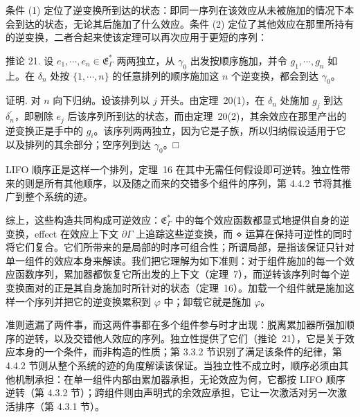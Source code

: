 条件 (1) 定位了逆变换所到达的状态：即同一序列在该效应从未被施加的情况下本会到达的状态，无论其后施加了什么效应。条件 (2) 定位了其他效应在那里所持有的逆变换，二者合起来使该定理可以再次应用于更短的序列：

推论 21. 设 \(e _ { 1 } , \cdots , e _ { n } \in \mathfrak { E } _ { \Gamma } ^ { * }\) 两两独立，从
\(\gamma _ { 0 }\) 出发按顺序施加，并令 \(g _ { 1 } , \cdots , g _ { n }\) 如上。在 \(\delta _ { n }\) 处按
\(\{ 1 , \cdots , n \}\) 的任意排列的顺序施加这 \(n\) 个逆变换，都会到达 \(\gamma _ { 0 }\)。

证明. 对 \(n\) 向下归纳。设该排列以 \(j\) 开头。由定理~20(1)，在 \(\delta _ { n }\) 处施加 \(g _ { j }\) 到达
\(\delta _ { n } ^ { \prime }\)，即剔除 \(e _ { j }\) 后该序列所到达的状态，而由定理~20(2)，其余效应在那里产出的逆变换正是手中的 \(g _ { i }\)。该序列两两独立，因为它是子族，所以归纳假设适用于它以及排列的其余部分；空序列到达
\(\gamma _ { 0 }\)。□

LIFO 顺序正是这样一个排列，定理~16 在其中无需任何假设即可逆转。独立性带来的则是所有其他顺序，以及随之而来的交错多个组件的序列，第 4.4.2 节将其推广到整个系统的迹。

综上，这些构造共同构成可逆效应：\(\mathfrak { E } _ { \Gamma } ^ { * }\) 中的每个效应函数都显式地提供自身的逆变换，effect 在效应上下文 \(\partial \Gamma\) 上追踪这些逆变换，而 ⋄ 运算在保持可逆性的同时将它们复合。它们所带来的是局部的时序可组合性；所谓局部，是指该保证只针对单一组件的效应本身来解读。我们把它理解为如下准则：对于组件施加的每一个效应函数序列，累加器都恢复它所出发的上下文（定理~7），而逆转该序列时每个逆变换面对的正是其自身施加时所针对的状态（定理~16）。加载一个组件就是施加这样一个序列并把它的逆变换累积到 \(\varphi\) 中；卸载它就是施加 \(\varphi\)。

准则遗漏了两件事，而这两件事都在多个组件参与时才出现：脱离累加器所强加顺序的逆转，以及交错他人效应的序列。独立性提供了它们（推论~21），它是关于效应本身的一个条件，而非构造的性质；第 3.3.2 节识别了满足该条件的纪律，第 4.4.2 节则从整个系统的迹的角度解读该保证。当独立性不成立时，顺序必须由其他机制承担：在单一组件内部由累加器承担，无论效应为何，它都按 LIFO 顺序逆转（第 4.3.2 节）；跨组件则由声明式的余效应承担，它让一次激活对另一次激活排序（第 4.3.1 节）。
